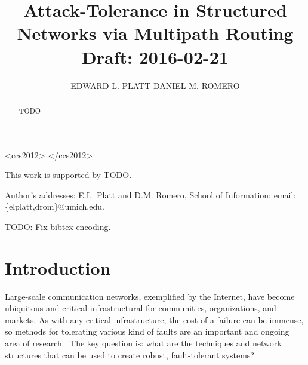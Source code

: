 \documentclass[prodmode,permissions]{acmsmall-ec16}
\begin{document}

\title{
Attack-Tolerance in Structured Networks via Multipath Routing
\\ Draft: 2016-02-21
}
\author{EDWARD L. PLATT
DANIEL M. ROMERO
}

\begin{abstract}
TODO
\end{abstract}


\begin{CCSXML}
<ccs2012>
</ccs2012>  
\end{CCSXML}




\begin{bottomstuff}
This work is supported by TODO.

Author's addresses: E.L. Platt and D.M. Romero, School of Information; email: \{elplatt,drom\}@umich.edu.
\end{bottomstuff}

\maketitle

TODO: Fix bibtex encoding. 

\section{Introduction}

Large-scale communication networks, exemplified by the Internet,
have become ubiquitous and critical infrastructural for
communities, organizations, and markets.
As with any critical infrastructure, the cost of a failure can be
immense, so methods for tolerating various kind of faults are an
important and ongoing area of research
\cite{zin_survey_2015,albert_error_2000,sterbenz_resilience_2010}.
The key question is: what are the techniques and network structures that can
be used to create robust, fault-tolerant systems?
\end{document}

